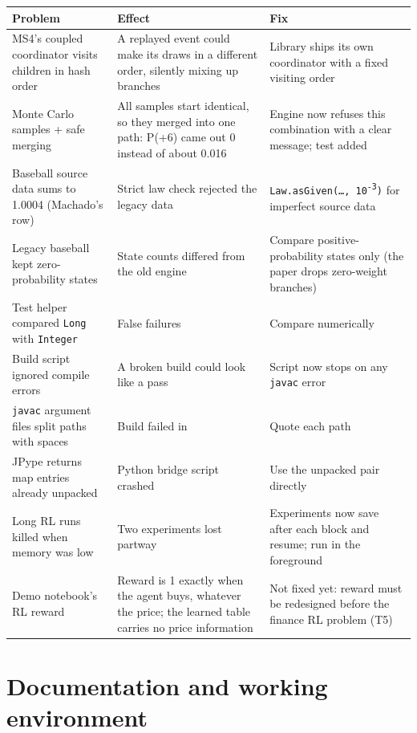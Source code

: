 \documentclass[11pt]{article}
\newcommand{\code}[1]{\texttt{#1}}
\begin{document}
\begin{tabularx}{\linewidth}{@{}>{\raggedright}p{4.4cm}>{\raggedright}p{4.6cm}Y@{}}
\toprule
\textbf{Problem} & \textbf{Effect} & \textbf{Fix}\\
\midrule
MS4's coupled coordinator visits children in hash order & A replayed event could make its draws in a different
  order, silently mixing up branches & Library ships its own coordinator with a fixed visiting order\\
Monte Carlo samples + safe merging & All samples start identical, so they merged into one path: P(+6) came out 0
  instead of about 0.016 & Engine now refuses this combination with a clear message; test added\\
Baseball source data sums to 1.0004 (Machado's row) & Strict law check rejected the legacy data &
  \code{Law.asGiven(\dots, 10\textsuperscript{-3})} for imperfect source data\\
Legacy baseball kept zero-probability states & State counts differed from the old engine & Compare
  positive-probability states only (the paper drops zero-weight branches)\\
Test helper compared \code{Long} with \code{Integer} & False failures & Compare numerically\\
Build script ignored compile errors & A broken build could look like a pass & Script now stops on any
  \code{javac} error\\
\code{javac} argument files split paths with spaces & Build failed in  & Quote each path\\
JPype returns map entries already unpacked & Python bridge script crashed & Use the unpacked pair directly\\
Long RL runs killed when memory was low & Two experiments lost partway & Experiments now save after each block
  and resume; run in the foreground\\
Demo notebook's RL reward & Reward is 1 exactly when the agent buys, whatever the price; the learned table carries
  no price information & Not fixed yet: reward must be redesigned before the finance RL problem (T5)\\
\bottomrule
\end{tabularx}

\section{Documentation and working environment}\label{sec:docs}
\end{document}
